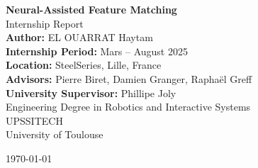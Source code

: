 \documentclass[a4paper,10pt]{report} %
\begin{document}

\vspace*{4cm}

\begin{center}
    \Huge \textbf{Neural-Assisted Feature Matching}\\[1.5cm]
    \LARGE Internship Report\\[1.5cm]
    \large \textbf{Author:} EL OUARRAT Haytam\\
    \textbf{Internship Period:} Mars – August 2025\\
    \textbf{Location:} SteelSeries, Lille, France\\[2cm]

    \textbf{Advisors:} Pierre Biret, Damien Granger, Raphaël Greff\\
    \textbf{University Supervisor:} Phillipe Joly \\[2cm]

    \large Engineering Degree in Robotics and Interactive Systems \\
    UPSSITECH \\
    University of Toulouse
\end{center}

\vfill

\begin{center}
    \today
\end{center}
\end{document}
